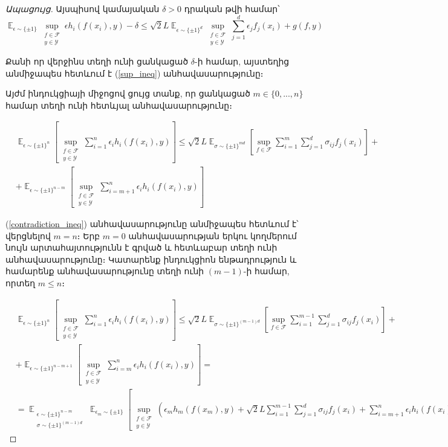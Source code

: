 \documentclass[12pt]{article}
\DeclareMathOperator*{\E}{\mathbb{E}}
\begin{document}
\begin{proof}[Ապացույց]
Այսպիսով կամայական $\delta > 0$ դրական թվի համար՝
$$\E_{\epsilon \sim \{\pm1\}}\sup_{\substack{f \in \mathcal{F} \\ y \in \mathcal{Y}}}    {\epsilon h_i(f(x_i), y)} - \delta  \leq {\sqrt{2}L} \E_{\epsilon \sim \{\pm 1\}^d}        \sup_{\substack{f \in \mathcal{F}  \\ y \in \mathcal{Y}  }}     \sum_{j=1}^d \epsilon_j f_j(x_i)    +   g(f, y)   $$

Քանի որ վերջինս տեղի ունի ցանկացած  $\delta$-ի համար, այստեղից անմիջապես հետևում է (\ref{sup_ineq}) անհավասարությունը։

\par Այժմ ինդուկցիայի միջոցով ցույց տանք,
որ  ցանկացած $m \in \{0, ..., n\}$ համար տեղի ունի հետևյալ անհավասարությունը։

\begin{align*}
&\E_{\epsilon \sim \{\pm 1\}^n}\left[\sup_{\substack{f \in \mathcal{F} \\ y \in \mathcal{Y}} }  \sum_{i=1}^n{\epsilon_ih_i(f(x_i), y)}  \right]    \leq \sqrt{2}L \E_{\sigma \sim \{\pm1\}^{md}} \left[  \sup_{f \in \mathcal{F}}  \sum_{i=1}^m\sum_{j=1}^d{\sigma_{ij}f_j(x_i)}   \right] +\\ &+\E_{\epsilon \sim \{\pm 1\}^{n-m}}\left[\sup_{\substack{f \in \mathcal{F} \\ y \in \mathcal{Y}} }  \sum_{i=m+1}^n{\epsilon_ih_i(f(x_i), y)}  \right]   
\end{align*}

(\ref{contradiction_ineq}) անհավասարությունը անմիջապես հետևում է՝ վերցնելով $m = n$։ Երբ $m=0$ անհավասարության երկու կողմերում նույն արտահայտությունն է գրված և հետևաբար տեղի ունի անհավասարությունը։ Կատարենք ինդուկցիոն ենթադրություն և համարենք անհավասարությունը տեղի ունի $(m-1)$-ի համար, որտեղ $m \leq n$։



\begin{align*}
&\E_{\epsilon \sim \{\pm 1\}^n}\left[\sup_{\substack{f \in \mathcal{F} \\ y \in \mathcal{Y}} }  \sum_{i=1}^n{\epsilon_ih_i(f(x_i), y)}  \right]   
 \leq \sqrt{2}L \E_{\sigma \sim \{\pm1\}^{(m-1)d}} \left[  \sup_{f \in \mathcal{F}}  \sum_{i=1}^{m-1}\sum_{j=1}^d{\sigma_{ij}f_j(x_i)}   \right] +\\ 
 &+\E_{\epsilon \sim \{\pm 1\}^{n-m+1}}\left[\sup_{\substack{f \in \mathcal{F} \\ y \in \mathcal{Y}} }  \sum_{i=m}^n{\epsilon_ih_i(f(x_i), y)}  \right] = \\  
 &= \E_{\substack{\epsilon \sim \{ \pm 1\}^{n-m}   \\ \sigma \sim \{ \pm 1\}^{(m-1)d} }}     \E_{\epsilon_m \sim \{ \pm1 \}} \left [          \sup_{\substack{f \in \mathcal{F} \\ y \in \mathcal{Y}}}     \left(\epsilon_m h_m(f(x_m), y)   +   \sqrt{2}L 				 \sum_{i=1}^{m-1}\sum_{j=1}^d{\sigma_{ij}f_j(x_i)}  + \sum_{i = m+1}^n \epsilon_ih_i(f(x_i), y)				\right )	\right ]
\end{align*}



\end{proof}
\end{document}
